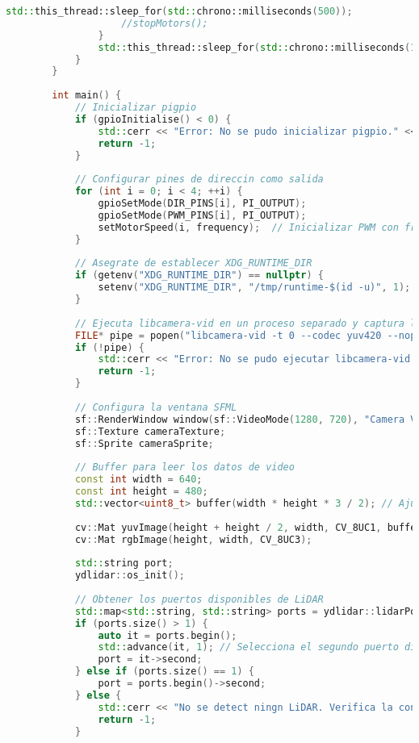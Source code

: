 \begin{lstlisting}[language={C++}, caption={Primer ajuste de c\'odigo}, label={Script}]
                    std::this_thread::sleep_for(std::chrono::milliseconds(500));
                    //stopMotors();
                }
                std::this_thread::sleep_for(std::chrono::milliseconds(100));
            }
        }
        
        int main() {
            // Inicializar pigpio
            if (gpioInitialise() < 0) {
                std::cerr << "Error: No se pudo inicializar pigpio." << std::endl;
                return -1;
            }
        
            // Configurar pines de direccin como salida
            for (int i = 0; i < 4; ++i) {
                gpioSetMode(DIR_PINS[i], PI_OUTPUT);
                gpioSetMode(PWM_PINS[i], PI_OUTPUT);
                setMotorSpeed(i, frequency);  // Inicializar PWM con frecuencia inicial
            }
        
            // Asegrate de establecer XDG_RUNTIME_DIR
            if (getenv("XDG_RUNTIME_DIR") == nullptr) {
                setenv("XDG_RUNTIME_DIR", "/tmp/runtime-$(id -u)", 1);
            }
        
            // Ejecuta libcamera-vid en un proceso separado y captura la salida en YUV, sin previsualizacn
            FILE* pipe = popen("libcamera-vid -t 0 --codec yuv420 --nopreview -o -", "r");
            if (!pipe) {
                std::cerr << "Error: No se pudo ejecutar libcamera-vid." << std::endl;
                return -1;
            }
        
            // Configura la ventana SFML
            sf::RenderWindow window(sf::VideoMode(1280, 720), "Camera Visualization with LiDAR");
            sf::Texture cameraTexture;
            sf::Sprite cameraSprite;
        
            // Buffer para leer los datos de video
            const int width = 640;
            const int height = 480;
            std::vector<uint8_t> buffer(width * height * 3 / 2); // Ajusta el tamao del buffer para YUV420
        
            cv::Mat yuvImage(height + height / 2, width, CV_8UC1, buffer.data());
            cv::Mat rgbImage(height, width, CV_8UC3);
        
            std::string port;
            ydlidar::os_init();
        
            // Obtener los puertos disponibles de LiDAR
            std::map<std::string, std::string> ports = ydlidar::lidarPortList();
            if (ports.size() > 1) {
                auto it = ports.begin();
                std::advance(it, 1); // Selecciona el segundo puerto disponible
                port = it->second;
            } else if (ports.size() == 1) {
                port = ports.begin()->second;
            } else {
                std::cerr << "No se detect ningn LiDAR. Verifica la conexin." << std::endl;
                return -1;
            }
        

\end{lstlisting}
